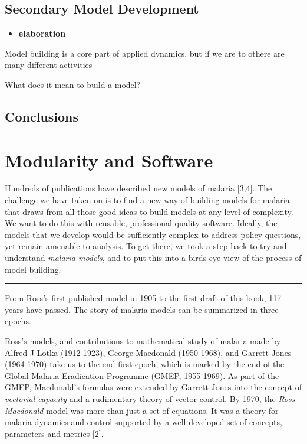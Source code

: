 \documentclass[
]{book}
\providecommand{\tightlist}{%
  \setlength{\itemsep}{0pt}\setlength{\parskip}{0pt}}
\begin{document}
\hypertarget{secondary-model-development}{%
\section{Secondary Model Development}\label{secondary-model-development}}

\begin{itemize}
\tightlist
\item
  \textbf{elaboration}
\end{itemize}

Model building is a core part of applied dynamics, but if we are to othere are many different activities

What does it mean to build a model?

\hypertarget{conclusions}{%
\section{Conclusions}\label{conclusions}}

\hypertarget{modularity-and-software}{%
\chapter{Modularity and Software}\label{modularity-and-software}}

Hundreds of publications have described new models of malaria {[}\protect\hyperlink{ref-ReinerRC2013SystematicReview}{3},\protect\hyperlink{ref-SmithNR2018AgentbasedModels}{4}{]}. The challenge we have taken on is to find a new way of building models for malaria that draws from all those good ideas to build models at any level of complexity. We want to do this with reusable, professional quality software. Ideally, the models that we develop would be sufficiently complex to address policy questions, yet remain amenable to analysis. To get there, we took a step back to try and understand \emph{malaria models}, and to put this into a birds-eye view of the process of model building.

\begin{center}\rule{0.5\linewidth}{0.5pt}\end{center}

From Ross's first published model in 1905 to the first draft of this book, 117 years have passed. The story of malaria models can be summarized in three epochs.

Ross's models, and contributions to mathematical study of malaria made by Alfred J Lotka (1912-1923), George Macdonald (1950-1968), and Garrett-Jones (1964-1970) take us to the end first epoch, which is marked by the end of the Global Malaria Eradication Programme (GMEP, 1955-1969). As part of the GMEP, Macdonald's formulas were extended by Garrett-Jones into the concept of \emph{vectorial capacity} and a rudimentary theory of vector control. By 1970, the \emph{Ross-Macdonald} model was more than just a set of equations. It was a theory for malaria dynamics and control supported by a well-developed set of concepts, parameters and metrics {[}\protect\hyperlink{ref-SmithDL2012_RossMacdonald}{2}{]}.
\end{document}
